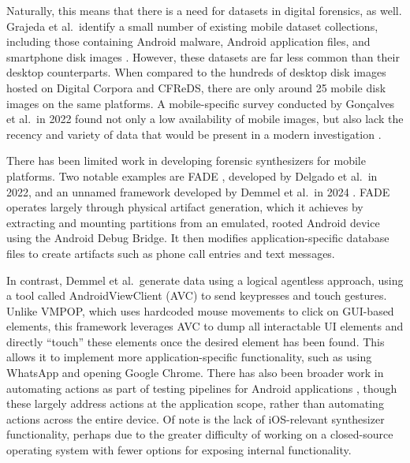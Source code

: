 \documentclass[letterpaper,12pt]{report}
\begin{document}
Naturally, this means that there is a need for datasets in digital
forensics, as well. Grajeda et al.~identify a small number of existing
mobile dataset collections, including those containing Android malware,
Android application files, and smartphone disk images
\cite{grajedaAvailabilityDatasetsDigital2017}. However, these
datasets are far less common than their desktop counterparts. When
compared to the hundreds of desktop disk images hosted on Digital
Corpora and CFReDS, there are only around 25 mobile disk images on the
same platforms. A mobile-specific survey conducted by Gonçalves et
al.~in 2022 found not only a low availability of mobile images, but also
lack the recency and variety of data that would be present in a modern
investigation \cite{goncalvesRevisitingDatasetGap2022}.

There has been limited work in developing forensic synthesizers for
mobile platforms. Two notable examples are FADE
\cite{ceballosdelgadoFADEForensicImage2022}, developed by Delgado et
al.~in 2022, and an unnamed framework developed by Demmel et al.~in 2024
\cite{demmelDataSynthesisGoing2024}. FADE operates largely through
physical artifact generation, which it achieves by extracting and
mounting partitions from an emulated, rooted Android device using the
Android Debug Bridge. It then modifies application-specific database
files to create artifacts such as phone call entries and text messages.

In contrast, Demmel et al.~generate data using a logical agentless
approach, using a tool called AndroidViewClient (AVC) to send keypresses
and touch gestures. Unlike VMPOP, which uses hardcoded mouse movements
to click on GUI-based elements, this framework leverages AVC to dump all
interactable UI elements and directly ``touch'' these elements once the
desired element has been found. This allows it to implement more
application-specific functionality, such as using WhatsApp and opening
Google Chrome. There has also been broader work in automating actions as
part of testing pipelines for Android applications
\cite{janickiObstaclesOpportunitiesDeploying2012,nagowahNovelApproachAutomation2012,linares-vasquezHowDevelopersTest2017},
though these largely address actions at the application scope, rather
than automating actions across the entire device. Of note is the lack of
iOS-relevant synthesizer functionality, perhaps due to the greater
difficulty of working on a closed-source operating system with fewer
options for exposing internal functionality.
\end{document}
